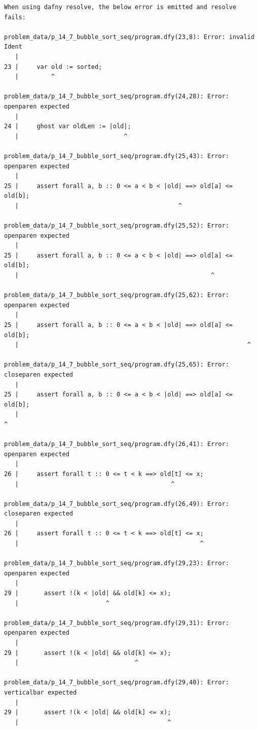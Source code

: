 \documentclass{article}
\begin{document}
\begin{lstlisting}
When using dafny resolve, the below error is emitted and resolve fails:

problem_data/p_14_7_bubble_sort_seq/program.dfy(23,8): Error: invalid Ident
   |
23 |     var old := sorted;
   |         ^

problem_data/p_14_7_bubble_sort_seq/program.dfy(24,28): Error: openparen expected
   |
24 |     ghost var oldLen := |old|;
   |                             ^

problem_data/p_14_7_bubble_sort_seq/program.dfy(25,43): Error: openparen expected
   |
25 |     assert forall a, b :: 0 <= a < b < |old| ==> old[a] <= old[b];
   |                                            ^

problem_data/p_14_7_bubble_sort_seq/program.dfy(25,52): Error: openparen expected
   |
25 |     assert forall a, b :: 0 <= a < b < |old| ==> old[a] <= old[b];
   |                                                     ^

problem_data/p_14_7_bubble_sort_seq/program.dfy(25,62): Error: openparen expected
   |
25 |     assert forall a, b :: 0 <= a < b < |old| ==> old[a] <= old[b];
   |                                                               ^

problem_data/p_14_7_bubble_sort_seq/program.dfy(25,65): Error: closeparen expected
   |
25 |     assert forall a, b :: 0 <= a < b < |old| ==> old[a] <= old[b];
   |                                                                  ^

problem_data/p_14_7_bubble_sort_seq/program.dfy(26,41): Error: openparen expected
   |
26 |     assert forall t :: 0 <= t < k ==> old[t] <= x;
   |                                          ^

problem_data/p_14_7_bubble_sort_seq/program.dfy(26,49): Error: closeparen expected
   |
26 |     assert forall t :: 0 <= t < k ==> old[t] <= x;
   |                                                  ^

problem_data/p_14_7_bubble_sort_seq/program.dfy(29,23): Error: openparen expected
   |
29 |       assert !(k < |old| && old[k] <= x);
   |                        ^

problem_data/p_14_7_bubble_sort_seq/program.dfy(29,31): Error: openparen expected
   |
29 |       assert !(k < |old| && old[k] <= x);
   |                                ^

problem_data/p_14_7_bubble_sort_seq/program.dfy(29,40): Error: verticalbar expected
   |
29 |       assert !(k < |old| && old[k] <= x);
   |                                         ^


\end{lstlisting}
\end{document}
